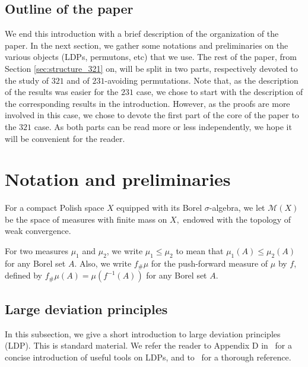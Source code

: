 \documentclass[a4paper,11pt]{amsart}
\theoremstyle{definition}
\begin{document}
\subsection{Outline of the paper}
We end this introduction with a brief description of the organization of the paper. In the next section, we gather some notations and preliminaries on the various objects (LDPs, permutons, etc) that we use. 
The rest of the paper, from Section \ref{sec:structure_321} on, will be split in two parts, respectively devoted to the study of $321$ and of $231$-avoiding permutations. 
Note that, as the description of the results was easier for the $231$ case, we chose to start with the description of the corresponding results in the introduction. 
However, as the proofs are more involved in this case, we chose to devote the first part of the core of the paper to the $321$ case. As both parts can be read more or less independently, we hope it will be convenient for the reader.


\section{Notation and preliminaries}

For a compact Polish space $X$ equipped with its Borel $\sigma$-algebra, we let $\mathcal M(X)$ be the space of measures with finite mass on $X,$ endowed with the topology of weak convergence.

For two measures $\mu_1$ and $\mu_2$, we write $\mu_1 \le \mu_2$ to mean that $\mu_1(A) \le \mu_2(A)$ for any Borel set $A.$
Also, we write $f_{\#}\mu$ for the push-forward measure of $\mu$ by $f$, defined by $f_{\#}\mu (A)=\mu(f^{-1}(A))$
for any Borel set $A.$


\subsection{Large deviation principles}
\label{ssec:LDP}

In this subsection, we give a short introduction to large deviation principles (LDP).
This is standard material.
We refer the reader to Appendix D in~\cite{anderson2010BookRandomMatrix} for a concise introduction of useful tools on LDPs, and to~\cite{dembo1998large-deviations} for a thorough reference.
\end{document}
